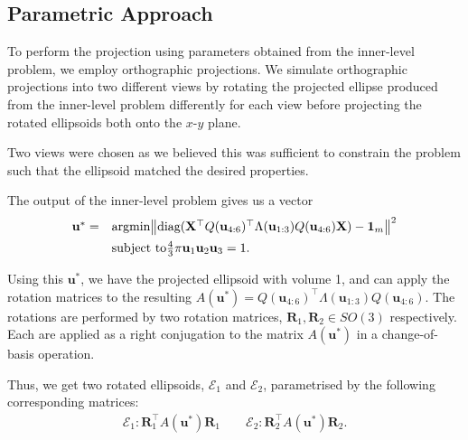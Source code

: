 \documentclass{article}
\DeclareMathOperator*{\argmin}{argmin}
\begin{document}
\subsection{Parametric Approach}
To perform the projection using parameters obtained from the inner-level problem, we employ orthographic projections. We simulate orthographic projections into two different views by rotating the projected ellipse produced from the inner-level problem differently for each view before projecting the rotated ellipsoids both onto the $x$-$y$ plane.

Two views were chosen as we believed this was sufficient to constrain the problem such that the ellipsoid matched the desired properties.

The output of the inner-level problem gives us a vector 
$$
\begin{array}{ll}
    \mathbf u^* = &\argmin \lr\Vert\Vert {\text{diag}(\mathbf X^\top Q(\mathbf u_{4:6}) ^\top \Lambda(\mathbf u_{1:3}) Q(\mathbf u_{4:6}) \mathbf X) - \mathbf 1_m} ^2 \\[0.5em] &\text{subject to} \frac{4}{3} \pi \mathbf u_1 \mathbf u_2 \mathbf u_3 = 1.
\end{array}          
$$

Using this $\mathbf u^*$, we have the projected ellipsoid with volume 1, and can apply the rotation matrices to the resulting $A(\mathbf u^*) = Q(\mathbf u_{4:6}) ^\top \Lambda(\mathbf u_{1:3}) Q(\mathbf u_{4:6})$. The rotations are performed by two rotation matrices, $\mathbf R_1, \mathbf R_2 \in SO(3)$ respectively. Each are applied as a right conjugation to the matrix $A(\mathbf u^*)$ in a change-of-basis operation.

Thus, we get two rotated ellipsoids, $\mathcal E_1$ and $\mathcal E_2$, parametrised by the following corresponding matrices:
\begin{align}
    \mathcal E_1: \mathbf{R}_1^\top A(\mathbf u^*) \mathbf{R}_1 \qquad \mathcal E_2: \mathbf{R}_2^\top A(\mathbf u^*) \mathbf{R}_2.
\end{align}
\end{document}
